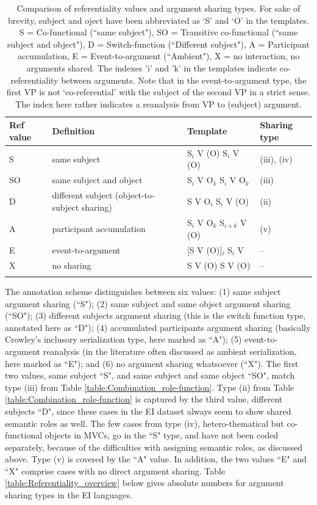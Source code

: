 \begin{table}
\begin{tabular}{l p{4cm} l l}
\lsptoprule
Ref value & Definition & Template & Sharing type \\ 
\hline 
S & same subject & S$_i$ V (O) S$_i$ V (O) &  (iii), (iv) \\ 
SO & same subject and object & S$_i$ V O$_k$ S$_i$ V O$_k$ & (iii) \\ 
D & different subject (object-to-subject sharing) & S V O$_i$ S$_i$ V (O) & (ii) \\ 
A & participant accumulation & S$_i$ V O$_k$ S$_{i+k}$ V (O) & (v) \\  
E & event-to-argument & [S V (O)]$_i$ S$_i$ V & -- \\ 
X & no sharing & S V (O) S V (O) & -- \\ 
\lspbottomrule 
\end{tabular} 
\caption[Comparison of referentiality and argument sharing types]{Comparison of referentiality values and argument sharing types. For sake of brevity, subject and oject have been abbreviated as `S' and `O' in the templates. S = Co-functional (``same subject"), SO = Transitive co-functional (``same subject and object"), D = Switch-function (``Different subject"), A = Participant accumulation, E = Event-to-argument (``Ambient"), X = no interaction, no arguments shared. The indexes 'i' and 'k' in the templates indicate co-referentiality between arguments. Note that in the event-to-argument type, the first VP is not `co-referential' with the subject of the second VP in a strict sense. The index here rather indicates a reanalysis from VP to (subject) argument.}
\label{table:comparison_ref-sharing}
\end{table}

The annotation scheme distinguishes between six values: (1) same subject argument sharing (``S"); (2) same subject and same object argument sharing (``SO"); (3) different subjects argument sharing (this is the switch function type, annotated here as ``D"); (4) accumulated participants argument sharing (basically Crowley's inclusory serialization type, here marked as ``A"); (5) event-to-argument reanalysis (in the literature often discussed as ambient serialization, here marked as ``E"); and (6) no argument sharing whatsoever (``X"). The first two values, same subject ``S", and same subject and same object ``SO", match type (iii) from Table \ref{table:Combination_role-function}. Type (ii) from Table \ref{table:Combination_role-function} is captured by the third value, different subjects ``D", since these cases in the EI dataset always seem to show shared semantic roles as well. The few cases from type (iv), hetero-thematical but co-functional objects in MVCs, go in the ``S" type, and have not been coded separately, because of the difficulties with assigning semantic roles, as discussed above. Type (v) is covered by the ``A" value. In addition, the two values ``E" and ``X" comprise cases with no direct argument sharing. Table \ref{table:Referentiality_overview} below gives absolute numbers  for argument sharing types in the EI languages.

